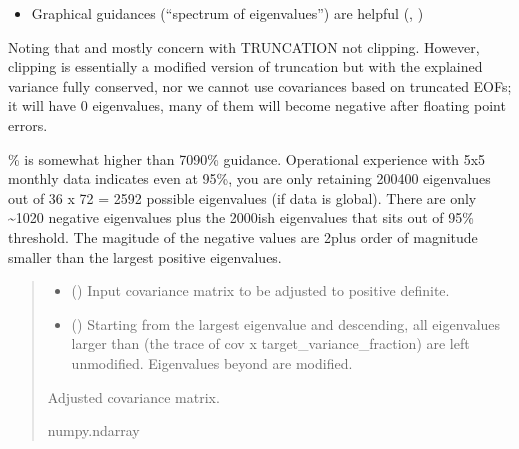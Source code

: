 \documentclass[letterpaper,10pt,english]{sphinxmanual}
\begin{document}
\begin{fulllineitems}
\begin{itemize}
\item {}
\sphinxAtStartPar
Graphical guidances (“spectrum of eigenvalues”) are helpful (,
)

\end{itemize}

\sphinxAtStartPar
Noting that  and  mostly concern with TRUNCATION not
clipping. However, clipping is essentially a modified version of
truncation but with the explained variance fully conserved, nor
we cannot use covariances based on truncated EOFs; it will have 0
eigenvalues, many of them will become negative after floating point
errors.

\% is somewhat higher than  70\sphinxhyphen{}90\% guidance. Operational
experience with 5x5 monthly data indicates even at 95\%, you are
only retaining 200\sphinxhyphen{}400 eigenvalues out of 36 x 72 = 2592 possible
eigenvalues (if data is global). There are only \textasciitilde{}10\sphinxhyphen{}20 negative eigenvalues
plus the 2000\sphinxhyphen{}ish eigenvalues that sits out of 95\% threshold. The magitude
of the negative values are 2\sphinxhyphen{}plus order of magnitude smaller than the
largest positive eigenvalues.
\begin{quote}\begin{description}
\begin{itemize}
\item {}
\sphinxAtStartPar
{} () \textendash{} Input covariance matrix to be adjusted to positive definite.

\item {}
\sphinxAtStartPar
{} () \textendash{} Starting from the largest eigenvalue and descending, all eigenvalues
larger than (the trace of cov x target\_variance\_fraction) are left
unmodified. Eigenvalues beyond are modified.

\end{itemize}

\sphinxAtStartPar
Adjusted covariance matrix.

\sphinxAtStartPar
numpy.ndarray

\end{description}\end{quote}



\end{fulllineitems}
\end{document}
